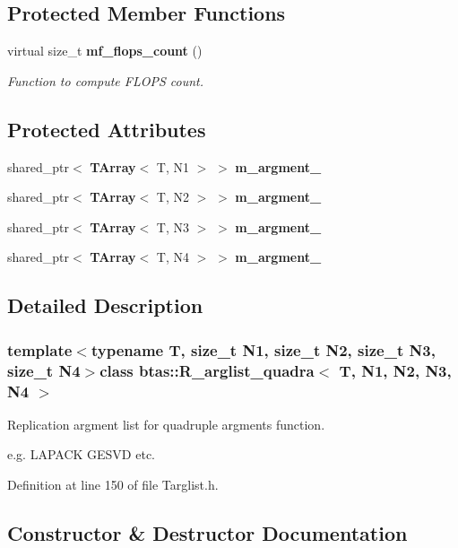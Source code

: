 \subsection*{Protected Member Functions}
\begin{DoxyCompactItemize}
\item 
virtual size\-\_\-t {\bf mf\-\_\-flops\-\_\-count} ()
\begin{DoxyCompactList}\small\item\em Function to compute F\-L\-O\-P\-S count. \end{DoxyCompactList}\end{DoxyCompactItemize}
\subsection*{Protected Attributes}
\begin{DoxyCompactItemize}
\item 
shared\-\_\-ptr$<$ {\bf T\-Array}$<$ T, N1 $>$ $>$ {\bf m\-\_\-argment\-\_}
\item 
shared\-\_\-ptr$<$ {\bf T\-Array}$<$ T, N2 $>$ $>$ {\bf m\-\_\-argment\-\_}
\item 
shared\-\_\-ptr$<$ {\bf T\-Array}$<$ T, N3 $>$ $>$ {\bf m\-\_\-argment\-\_}
\item 
shared\-\_\-ptr$<$ {\bf T\-Array}$<$ T, N4 $>$ $>$ {\bf m\-\_\-argment\-\_}
\end{DoxyCompactItemize}


\subsection{Detailed Description}
\subsubsection*{template$<$typename T, size\-\_\-t N1, size\-\_\-t N2, size\-\_\-t N3, size\-\_\-t N4$>$class btas\-::\-R\-\_\-arglist\-\_\-quadra$<$ T, N1, N2, N3, N4 $>$}

Replication argment list for quadruple argments function. 

e.\-g. L\-A\-P\-A\-C\-K G\-E\-S\-V\-D etc. 

Definition at line 150 of file Targlist.\-h.



\subsection{Constructor \& Destructor Documentation}
